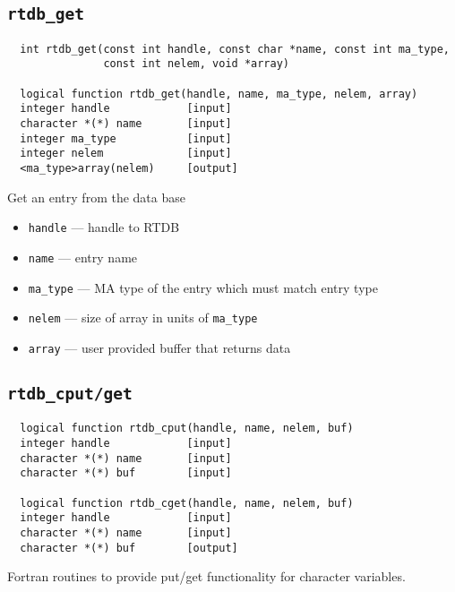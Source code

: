 \subsection{{\tt rtdb\_get}}
\begin{verbatim}
  int rtdb_get(const int handle, const char *name, const int ma_type,
               const int nelem, void *array)

  logical function rtdb_get(handle, name, ma_type, nelem, array)
  integer handle            [input]
  character *(*) name       [input]
  integer ma_type           [input]
  integer nelem             [input]
  <ma_type>array(nelem)     [output]
\end{verbatim}
Get an entry from the data base
\begin{itemize}
\item {\tt handle} --- handle to RTDB
\item {\tt name} --- entry name
\item {\tt ma\_type} --- MA type of the entry which must match entry type
\item {\tt nelem} --- size of array in units of {\tt ma\_type}
\item {\tt array} --- user provided buffer that returns data
\end{itemize}

\subsection{{\tt rtdb\_cput/get}}
\begin{verbatim}
  logical function rtdb_cput(handle, name, nelem, buf)
  integer handle            [input]
  character *(*) name       [input]
  character *(*) buf        [input]

  logical function rtdb_cget(handle, name, nelem, buf)
  integer handle            [input]
  character *(*) name       [input]
  character *(*) buf        [output]
\end{verbatim}
Fortran routines to provide put/get functionality for character
variables.

